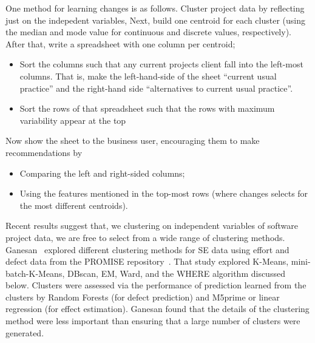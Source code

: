 \documentclass{sig-alternate}
\newcommand{\bi}{\begin{itemize}}
\newcommand{\ei}{\end{itemize}}
\begin{document}
One method for learning changes is as follows.  
  Cluster project data by reflecting just on the indepedent variables,
  Next, build one centroid for each cluster (using the median and mode value for continuous
and discrete values, respectively).
After that, write a spreadsheet with one column per centroid;
\bi
\item
Sort the columns such that any current projects client fall into the left-most
columns. That is, make the left-hand-side of the sheet  ``current usual practice''
and the right-hand side  ``alternatives to current usual practice''.
\item
Sort the rows of that spreadsheet such that the rows with
maximum  variability appear at the top 
\ei
Now show the sheet to the business user, encouraging them to make recommendations by
\bi
\item
Comparing the left and right-sided columns;
\item
Using the features mentioned in the top-most rows (where changes selects for the most different centroids).
\ei
	Recent results suggest that, we clustering on independent variables of software project data,
	we are free to select from a wide range of 
	clustering methods.  Ganesan~\cite{div14} explored 
	different clustering methods for SE data using   effort and defect data from
	the PROMISE repository~\cite{promiserepo}.
	That study explored
	K-Means, mini-batch-K-Means, DBscan, EM, Ward, and the WHERE algorithm discussed
	below.
	Clusters were assessed via the performance of prediction 
	learned from the clusters by Random Forests (for defect prediction)
	and M5prime or linear regression (for effect estimation).  Ganesan found
	that the details of the clustering method were less important than ensuring that  a large number of clusters were generated.
\end{document}
